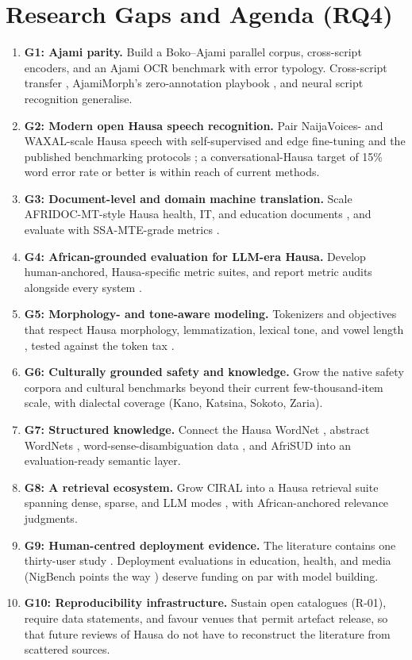 \documentclass[sn-basic,pdflatex]{sn-jnl}
\begin{document}
\section{Research Gaps and Agenda (RQ4)}\label{sec:gaps}
\begin{enumerate}\itemsep3pt
  \item \textbf{G1: Ajami parity.} Build a Boko--Ajami parallel corpus, cross-script encoders, and an Ajami OCR benchmark with error typology. Cross-script transfer \citep{p002}, AjamiMorph's zero-annotation playbook \citep{p023}, and neural script recognition \citep{p145} generalise.
  \item \textbf{G2: Modern open Hausa speech recognition.} Pair NaijaVoices- and WAXAL-scale Hausa speech \citep{p127,p046} with self-supervised and edge fine-tuning \citep{p125,p128} and the published benchmarking protocols \citep{p044}; a conversational-Hausa target of 15\% word error rate or better is within reach of current methods.
  \item \textbf{G3: Document-level and domain machine translation.} Scale AFRIDOC-MT-style Hausa health, IT, and education documents \citep{p030}, and evaluate with SSA-MTE-grade metrics \citep{p031}.
  \item \textbf{G4: African-grounded evaluation for LLM-era Hausa.} Develop human-anchored, Hausa-specific metric suites, and report metric audits alongside every system \citep{p033,p092}.
  \item \textbf{G5: Morphology- and tone-aware modeling.} Tokenizers and objectives that respect Hausa morphology, lemmatization, lexical tone, and vowel length \citep{p006,p066,p077}, tested against the token tax \citep{p019,p152}.
  \item \textbf{G6: Culturally grounded safety and knowledge.} Grow the native safety corpora \citep{p058,p059,p135,p136,p137,p138,p139,p140,p141,p142,p146} and cultural benchmarks \citep{p020,p144,p148} beyond their current few-thousand-item scale, with dialectal coverage (Kano, Katsina, Sokoto, Zaria).
  \item \textbf{G7: Structured knowledge.} Connect the Hausa WordNet \citep{p086}, abstract WordNets \citep{p022}, word-sense-disambiguation data \citep{p085}, and AfriSUD \citep{p121} into an evaluation-ready semantic layer.
  \item \textbf{G8: A retrieval ecosystem.} Grow CIRAL \citep{p008} into a Hausa retrieval suite spanning dense, sparse, and LLM modes \citep{p009,p010,p011}, with African-anchored relevance judgments.
  \item \textbf{G9: Human-centred deployment evidence.} The literature contains one thirty-user study \citep{p074}. Deployment evaluations in education, health, and media (NigBench points the way \citep{p147}) deserve funding on par with model building.
  \item \textbf{G10: Reproducibility infrastructure.} Sustain open catalogues (R-01), require data statements, and favour venues that permit artefact release, so that future reviews of Hausa do not have to reconstruct the literature from scattered sources.
\end{enumerate}
\end{document}
